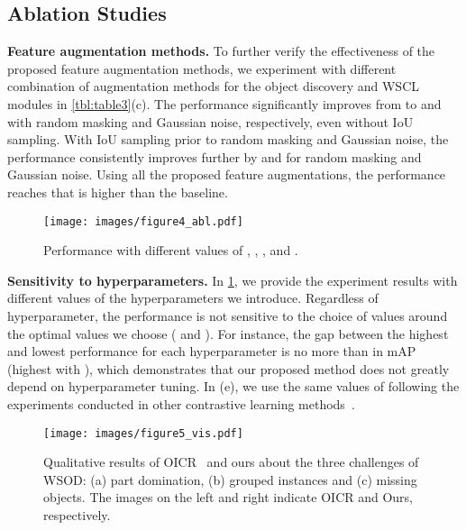 \documentclass[runningheads]{llncs}
\begin{document}
\subsection{Ablation Studies}
\noindent\textbf{Feature augmentation methods.}
To further verify the effectiveness of the proposed feature augmentation methods, we experiment with different combination of augmentation methods for the object discovery and WSCL modules in \cref{tbl:table3}(c).
The performance significantly improves from  to  and  with random masking and Gaussian noise, respectively, even without IoU sampling.
With IoU sampling prior to random masking and Gaussian noise, the performance consistently improves further by  and  for random masking and Gaussian noise.
Using all the proposed feature augmentations, the performance reaches  that is  higher than the baseline.

\begin{figure}[t!]
\centering
\texttt{[image: images/figure4\_abl.pdf]}
\caption{Performance with different values of , , ,  and .}
\label{fig:abl_study}
\end{figure}




\noindent\textbf{Sensitivity to hyperparameters.}
In \cref{fig:abl_study}, we provide the experiment results with different values of the hyperparameters we introduce.
Regardless of hyperparameter, the performance is not sensitive to the choice of values around the optimal values we choose ( and ).  
For instance, the gap between the highest and lowest performance for each hyperparameter is no more than  in mAP (highest with ), which demonstrates that our proposed method does not greatly depend on hyperparameter tuning.
In (e), we use the same values of  following the experiments conducted in other contrastive learning methods~\cite{khosla2020supervised,chen2020simple}.


\begin{figure*}[t!]
\centering
\texttt{[image: images/figure5\_vis.pdf]}
\caption{Qualitative results of OICR~\cite{Tang_2017_CVPR} and ours about the three challenges of WSOD: (a) part domination, (b) grouped instances and (c) missing objects. 
The images on the left and right  indicate OICR and Ours, respectively.}
\label{fig:visualization}
\end{figure*}
\end{document}
